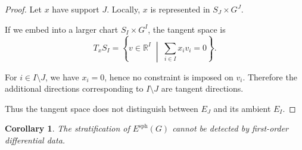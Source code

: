 \documentclass[11pt]{amsart}
\newtheorem{corollary}[theorem]{Corollary}
\begin{document}
\begin{proof}
Let $x$ have support $J$. Locally, $x$ is represented in $S_J \times G^J$.

If we embed into a larger chart $S_I \times G^I$, the tangent space is
\[
T_x S_I = \left\{ v \in \mathbb{R}^I \;\middle|\; \sum_{i\in I} x_i v_i = 0 \right\}.
\]

For $i \in I \setminus J$, we have $x_i = 0$, hence no constraint is imposed on $v_i$. Therefore the additional directions corresponding to $I \setminus J$ are tangent directions.

Thus the tangent space does not distinguish between $E_J$ and its ambient $E_I$.
\end{proof}

\begin{corollary}
The stratification of $E^{\mathrm{sph}}(G)$ cannot be detected by first-order differential data.
\end{corollary}
\end{document}
